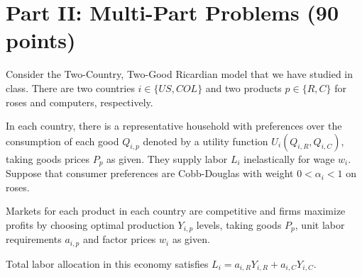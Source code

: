 \documentclass[11pt,letterpaper]{exam}
\begin{document}
\section*{Part II: Multi-Part Problems (90 points)}

\begin{questions}

\question[45]  Consider the Two-Country, Two-Good Ricardian model that we have studied in class. There are two countries $i \in \{ US,COL \}$ and two products $p \in \{R,C \}$ for roses and computers, respectively. 

In each country, there is a representative household with preferences over the consumption of each good $Q_{i,p}$ denoted by a utility function $U_{i}(Q_{i,R} , Q_{i,C})$, taking goods prices $P_{p}$ as given. They supply labor $L_i$ inelastically for wage $w_i$. Suppose that consumer preferences are Cobb-Douglas with weight $0 < \alpha_i < 1$ on roses. 

Markets for each product in each country are competitive and firms maximize profits by choosing optimal production $Y_{i,p}$ levels, taking goods $P_{p}$, unit labor requirements $a_{i,p}$ and factor prices $w_i$ as given.  

Total labor allocation in this economy satisfies $L_i = a_{i,R} Y_{i,R} + a_{i,C} Y_{i,C}$.

\end{questions}
\end{document}

